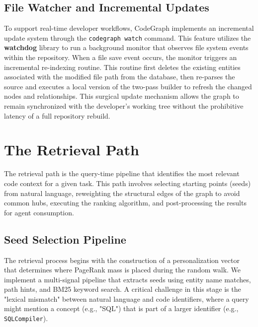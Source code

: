 \subsection{File Watcher and Incremental Updates}
\label{subsec:watcher-updates}

To support real-time developer workflows, CodeGraph implements an incremental update system through the \texttt{codegraph watch} command. This feature utilizes the \textbf{watchdog} library to run a background monitor that observes file system events within the repository. When a file save event occurs, the monitor triggers an incremental re-indexing routine. This routine first deletes the existing entities associated with the modified file path from the database, then re-parses the source and executes a local version of the two-pass builder to refresh the changed nodes and relationships. This surgical update mechanism allows the graph to remain synchronized with the developer's working tree without the prohibitive latency of a full repository rebuild.

\section{The Retrieval Path}
\label{sec:retrieval-path}

The retrieval path is the query-time pipeline that identifies the most relevant code context for a given task. This path involves selecting starting points (seeds) from natural language, reweighting the structural edges of the graph to avoid common hubs, executing the ranking algorithm, and post-processing the results for agent consumption.

\subsection{Seed Selection Pipeline}
\label{subsec:seed-selection}

The retrieval process begins with the construction of a personalization vector that determines where PageRank mass is placed during the random walk. We implement a multi-signal pipeline that extracts seeds using entity name matches, path hints, and BM25 keyword search. A critical challenge in this stage is the "lexical mismatch" between natural language and code identifiers, where a query might mention a concept (e.g., "SQL") that is part of a larger identifier (e.g., \texttt{SQLCompiler}). 

